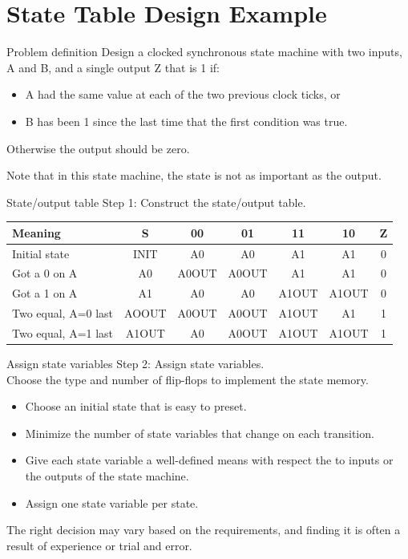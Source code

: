 \section{State Table Design Example}

\begin{frame}{Problem definition}
  Design a clocked synchronous state machine with two inputs, A and B, and a single output Z that is 1 if:
  \begin{itemize}
    \item A had the same value at each of the two previous clock ticks, or
    \item B has been 1 since the last time that the first condition was true.
  \end{itemize}
  Otherwise the output should be zero.
\end{frame}

Note that in this state machine, the state is not as important as the output.

\begin{frame}{State/output table}
  Step 1: Construct the state/output table.
\end{frame}

\begin{tabular}{lc|cccc|c}
  Meaning & S & 00 & 01 & 11 & 10 & Z \\
  \hline
  Initial state & INIT & A0 & A0 & A1 & A1 & 0 \\
  Got a 0 on A & A0 & A0OUT & A0OUT & A1 & A1 & 0 \\
  Got a 1 on A & A1 & A0 & A0 & A1OUT & A1OUT & 0 \\
  Two equal, A=0 last & AOOUT & A0OUT & A0OUT & A1OUT & A1 & 1 \\
  Two equal, A=1 last & A1OUT & A0 & A0OUT & A1OUT & A1OUT & 1 \\
\end{tabular}

\begin{frame}{Assign state variables}
  Step 2: Assign state variables. \\
  Choose the type and number of flip-flops to implement the state memory.
  \begin{itemize}
    \item Choose an initial state that is easy to preset.
    \item Minimize the number of state variables that change on each transition.
    \item Give each state variable a well-defined means with respect the to inputs or the outputs of the state machine.
    \item Assign one state variable per state.
  \end{itemize}
  The right decision may vary based on the requirements, and finding it is often a result of experience or trial and error.
\end{frame}

